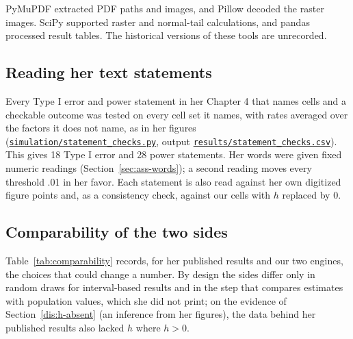 PyMuPDF \citep{pymupdfsoftware} extracted PDF paths and images, and Pillow \citep{pillowsoftware} decoded the raster images. SciPy \citep{virtanen2020} supported raster and normal-tail calculations, and pandas \citep{mckinney2010} processed result tables. The historical versions of these tools are unrecorded.

\subsection{Reading her text statements}\label{sec:statements}

Every Type I error and power statement in her Chapter 4 that names cells and a checkable outcome was tested on every cell set it names, with rates averaged over the factors it does not name, as in her figures (\href{https://github.com/alectionary/vibe-math/blob/master/formalization/chen-rdd-mediation/simulation/statement_checks.py}{\nolinkurl{simulation/statement_checks.py}}, output \href{https://github.com/alectionary/vibe-math/blob/master/formalization/chen-rdd-mediation/results/statement_checks.csv}{\nolinkurl{results/statement_checks.csv}}). This gives 18 Type I error and 28 power statements. Her words were given fixed numeric readings (Section~\ref{sec:ass-words}); a second reading moves every threshold .01 in her favor. Each statement is also read against her own digitized figure points and, as a consistency check, against our cells with $h$ replaced by 0.

\subsection{Comparability of the two sides}\label{sec:comparability}

Table~\ref{tab:comparability} records, for her published results and our two engines, the choices that could change a number. By design the sides differ only in random draws for interval-based results and in the step that compares estimates with population values, which she did not print; on the evidence of Section~\ref{dis:h-absent} (an inference from her figures), the data behind her published results also lacked $h$ where $h > 0$.

